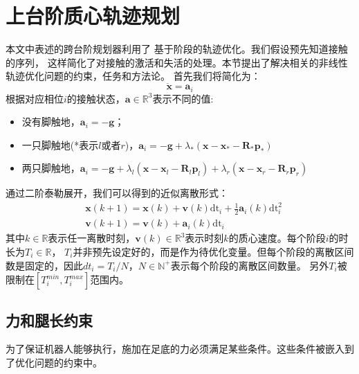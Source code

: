 \section{上台阶质心轨迹规划}
\label{sec:traj_plan}
本文中表述的跨台阶规划器利用了
基于阶段的轨迹优化。我们假设预先知道接触的序列，
这样简化了对接触的激活和失活的处理。本节提出了解决相关的非线性轨迹优化问题的约束，任务和方法论。
首先我们将简化为：
\begin{equation}
    \label{equ:acceleration}
    \ddot{\boldsymbol{x}} = \boldsymbol{a}_i
\end{equation}
根据对应相位$i$的接触状态，$\boldsymbol{a} \in \mathbb{R}^{3}$表示不同的值:
\begin{itemize}
    \item 没有脚触地，$\boldsymbol{a}_i = -\boldsymbol{g}$；
    \item 一只脚触地(*表示$l$或者$r$)，$\boldsymbol{a}_i=-\boldsymbol{g}+\lambda_*\left(\boldsymbol{x}-\boldsymbol{x}_*-\boldsymbol{R}_* \boldsymbol{p}_*\right)$
    \item 两只脚触地，$\boldsymbol{a}_i=-\boldsymbol{g}+\lambda_l\left(\boldsymbol{x}-\boldsymbol{x}_l-\boldsymbol{R}_l \boldsymbol{p}_l\right)
                    +\lambda_r\left(\boldsymbol{x}-\boldsymbol{x}_r-\boldsymbol{R}_r \boldsymbol{p}_r\right)$
\end{itemize}
通过二阶泰勒展开，我们可以得到的近似离散形式：
\begin{equation}
    \label{equ:approx_acc}
    \begin{aligned}
        & \boldsymbol{x}(k+1)=\boldsymbol{x}(k)+\boldsymbol{v}(k) \mathrm{dt}_i+\frac{1}{2} \boldsymbol{a}_i(k) \mathrm{dt}_i^2 \\
        & \boldsymbol{v}(k+1)=\boldsymbol{v}(k)+\boldsymbol{a}_i(k) \mathrm{dt}_i
        \end{aligned}
\end{equation}
其中$k \in \mathbb{R}$表示任一离散时刻，$\boldsymbol{v}(k) \in \mathbb{R}^{3}$表示时刻$k$的质心速度。每个阶段$i$的时长为$T_i \in \mathbb{R}$，
$T_i$并非预先设定好的，而是作为待优化变量。但每个阶段的离散区间数是固定的，因此$dt_i=T_i/N$，$N\in \mathbb{N}^+$表示每个阶段的离散区间数量。
另外$T_i$被限制在$[T_i^{min}, T_i^{max}]$范围内。

\subsection{力和腿长约束}
\label{constraints}
为了保证机器人能够执行，施加在足底的力必须满足某些条件。这些条件被嵌入到了优化问题的约束中。

